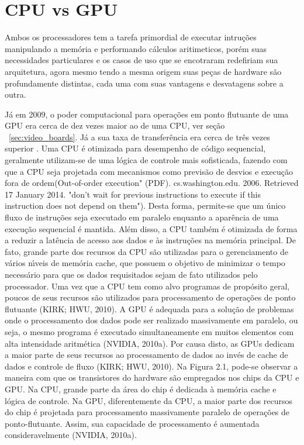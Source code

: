 \section{CPU vs GPU}

Ambos os processadores tem a tarefa primordial de executar intruções manipulando a memória e performando cálculos aritimeticos, porém suas necessidades particulares e os casos de uso que se encotraram redefiriam sua arquitetura, agora mesmo tendo a mesma origem suas peças de hardware são profundamente distintas, cada uma com suas vantagens e desvatagens sobre a outra.

Já em 2009, o poder computacional para operações em ponto flutuante de uma GPU era cerca de dez vezes maior ao de uma CPU, ver seção ~\ref{sec:video_boards}. Já a sua taxa de transferência era cerca de três vezes superior \citep{massively:16}. Uma CPU é otimizada para desempenho de código sequencial, geralmente utilizam-se de uma lógica de controle mais sofisticada, fazendo com que a CPU seja projetada com mecanismos como previsão de desvios e execução fora de ordem(Out-of-order execution" (PDF). cs.washington.edu. 2006. Retrieved 17 January 2014. "don't wait for previous instructions to execute if this instruction does not depend on them"). Desta forma, permite-se que um único fluxo de instruções seja executado em paralelo enquanto a aparência de uma execução sequencial é mantida. Além disso, a CPU também é otimizada de forma a reduzir a latência de acesso aos dados e às
instruções na memória principal. De fato, grande parte dos recursos da CPU são
utilizadas para o gerenciamento de vários nı́veis de memória cache, que possuem o
objetivo de minimizar o tempo necessário para que os dados requisitados sejam de
fato utilizados pelo processador. Uma vez que a CPU tem como alvo programas
de propósito geral, poucos de seus recursos são utilizados para processamento de
operações de ponto flutuante (KIRK; HWU, 2010).
A GPU é adequada para a solução de problemas onde o processamento dos
dados pode ser realizado massivamente em paralelo, ou seja, o mesmo programa
é executado simultaneamente em muitos elementos com alta intensidade aritmética
(NVIDIA, 2010a). Por causa disto, as GPUs dedicam a maior parte de seus recursos
ao processamento de dados ao invés de cache de dados e controle de fluxo (KIRK;
HWU, 2010).
Na Figura 2.1, pode-se observar a maneira com que os transistores do hardware
são empregados nos chips da CPU e GPU. Na CPU, grande parte da área do chip é
dedicada à memória cache e lógica de controle. Na GPU, diferentemente da CPU,
a maior parte dos recursos do chip é projetada para processamento massivamente
paralelo de operações de ponto-flutuante. Assim, sua capacidade de processamento
é aumentada consideravelmente (NVIDIA, 2010a).

